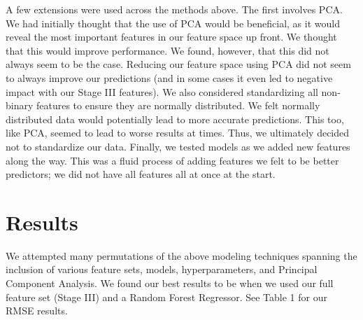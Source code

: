 \documentclass[11pt, oneside]{article}   	%
\begin{document}
A few extensions were used across the methods above. The first involves PCA. We had initially thought that the use of PCA would be beneficial, as it would reveal the most important features in our feature space up front. We thought that this would improve performance. We found, however, that this did not always seem to be the case. Reducing our feature space using PCA did not seem to always improve our predictions (and in some cases it even led to negative impact with our Stage III features). We also considered standardizing all non-binary features to ensure they are normally distributed. We felt normally distributed data would potentially lead to more accurate predictions. This too, like PCA, seemed to lead to worse results at times. Thus, we ultimately decided not to standardize our data. Finally, we tested models as we added new features along the way. This was a fluid process of adding features we felt to be better predictors; we did not have all features all at once at the start.

\section{Results}
We attempted many permutations of the above modeling techniques spanning the inclusion of various feature sets, models, hyperparameters, and Principal Component Analysis. We found our best results to be when we used our full feature set (Stage III) and a Random Forest Regressor. See Table 1 for our RMSE results. 
\end{document}
